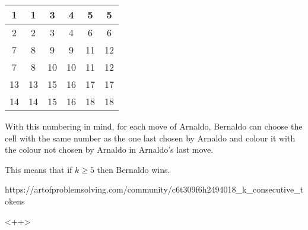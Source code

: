 \documentclass[a4paper]{article}
\begin{document}
\begin{question*}{}
{        \begin{tabular}{| c | c | c | c | c | c |} \hline 1&1&3&4&5&5\\ \hline 2&2&3&4&6&6\\ \hline 7&8&9&9&11&12\\ \hline 7&8&10&10&11&12\\ \hline 13&13&15&16&17&17\\ \hline 14&14&15&16&18&18\\ \hline \end{tabular}
        With this numbering in mind, for each move of Arnaldo, Bernaldo can choose the cell with the same number as the one last chosen by Arnaldo and colour it with the colour not chosen by Arnaldo in Arnaldo's last move.

        This means that if $k \ge 5$ then Bernaldo wins.
        }{%
        https://artofproblemsolving.com/community/c6t309f6h2494018_k_consecutive_tokens
    }

    <++>
\end{question*}
\end{document}

